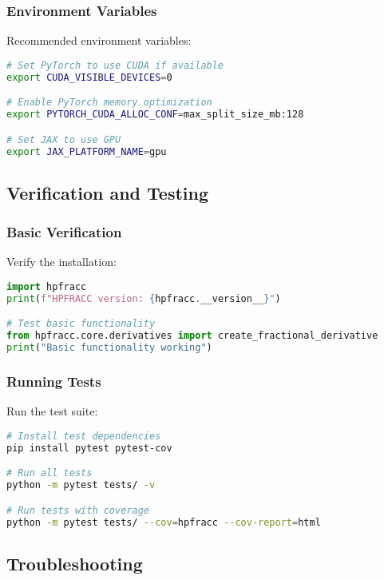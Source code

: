 \subsubsection{Environment Variables}
Recommended environment variables:

\begin{lstlisting}[language=bash, caption=Environment Variables]
# Set PyTorch to use CUDA if available
export CUDA_VISIBLE_DEVICES=0

# Enable PyTorch memory optimization
export PYTORCH_CUDA_ALLOC_CONF=max_split_size_mb:128

# Set JAX to use GPU
export JAX_PLATFORM_NAME=gpu
\end{lstlisting}

\subsection{Verification and Testing}

\subsubsection{Basic Verification}
Verify the installation:

\begin{lstlisting}[language=python, caption=Installation Verification]
import hpfracc
print(f"HPFRACC version: {hpfracc.__version__}")

# Test basic functionality
from hpfracc.core.derivatives import create_fractional_derivative
print("Basic functionality working")
\end{lstlisting}

\subsubsection{Running Tests}
Run the test suite:

\begin{lstlisting}[language=bash, caption=Running Tests]
# Install test dependencies
pip install pytest pytest-cov

# Run all tests
python -m pytest tests/ -v

# Run tests with coverage
python -m pytest tests/ --cov=hpfracc --cov-report=html
\end{lstlisting}

\subsection{Troubleshooting}

